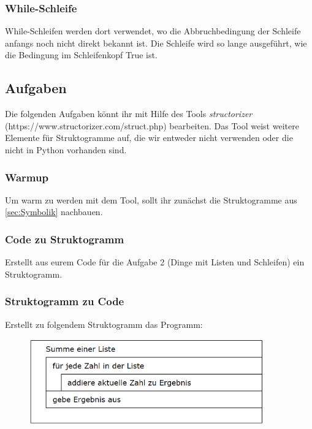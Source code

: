 \subsubsection{While-Schleife}
While-Schleifen werden dort verwendet, wo die Abbruchbedingung der Schleife anfangs noch nicht direkt bekannt ist. Die Schleife wird so lange ausgeführt, wie die Bedingung im Schleifenkopf True ist.

\subsection{Aufgaben}
Die folgenden Aufgaben könnt ihr mit Hilfe des Tools \textit{structorizer} (https://www.structorizer.com/struct.php) bearbeiten. Das Tool weist weitere Elemente für Struktogramme auf, die wir entweder nicht verwenden oder die nicht in Python vorhanden sind.

\subsubsection{Warmup}
Um warm zu werden mit dem Tool, sollt ihr zunächst die Struktogramme aus \ref{sec:Symbolik} nachbauen. 

\subsubsection{Code zu Struktogramm}
Erstellt aus eurem Code für die Aufgabe 2 (Dinge mit Listen und Schleifen) ein Struktogramm.

\subsubsection{Struktogramm zu Code}
Erstellt zu folgendem Struktogramm das Programm:
\begin{figure}[H]
\begin{center}
	\includegraphics[width=0.9\textwidth]{imgs/for_loop.png} %
\end{center}
\end{figure}

